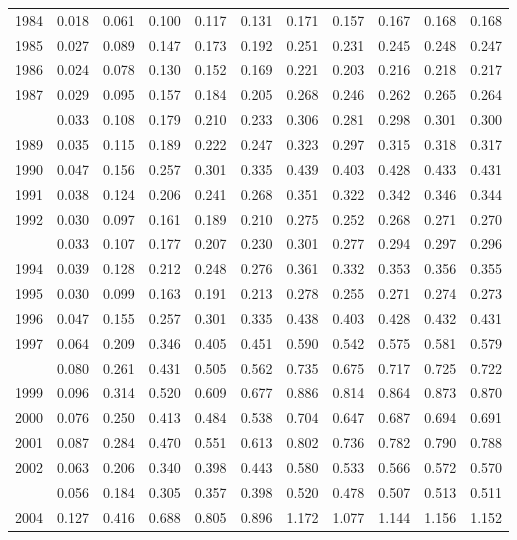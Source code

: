 \documentclass[
]{article}
\begin{document}
\begin{longtable}[t]{lrrrrrrrrrr}
1984 & 0.018 & 0.061 & 0.100 & 0.117 & 0.131 & 0.171 & 0.157 & 0.167 & 0.168 & 0.168\\
1985 & 0.027 & 0.089 & 0.147 & 0.173 & 0.192 & 0.251 & 0.231 & 0.245 & 0.248 & 0.247\\
1986 & 0.024 & 0.078 & 0.130 & 0.152 & 0.169 & 0.221 & 0.203 & 0.216 & 0.218 & 0.217\\
1987 & 0.029 & 0.095 & 0.157 & 0.184 & 0.205 & 0.268 & 0.246 & 0.262 & 0.265 & 0.264\\
\addlinespace
1988 & 0.033 & 0.108 & 0.179 & 0.210 & 0.233 & 0.306 & 0.281 & 0.298 & 0.301 & 0.300\\
1989 & 0.035 & 0.115 & 0.189 & 0.222 & 0.247 & 0.323 & 0.297 & 0.315 & 0.318 & 0.317\\
1990 & 0.047 & 0.156 & 0.257 & 0.301 & 0.335 & 0.439 & 0.403 & 0.428 & 0.433 & 0.431\\
1991 & 0.038 & 0.124 & 0.206 & 0.241 & 0.268 & 0.351 & 0.322 & 0.342 & 0.346 & 0.344\\
1992 & 0.030 & 0.097 & 0.161 & 0.189 & 0.210 & 0.275 & 0.252 & 0.268 & 0.271 & 0.270\\
\addlinespace
1993 & 0.033 & 0.107 & 0.177 & 0.207 & 0.230 & 0.301 & 0.277 & 0.294 & 0.297 & 0.296\\
1994 & 0.039 & 0.128 & 0.212 & 0.248 & 0.276 & 0.361 & 0.332 & 0.353 & 0.356 & 0.355\\
1995 & 0.030 & 0.099 & 0.163 & 0.191 & 0.213 & 0.278 & 0.255 & 0.271 & 0.274 & 0.273\\
1996 & 0.047 & 0.155 & 0.257 & 0.301 & 0.335 & 0.438 & 0.403 & 0.428 & 0.432 & 0.431\\
1997 & 0.064 & 0.209 & 0.346 & 0.405 & 0.451 & 0.590 & 0.542 & 0.575 & 0.581 & 0.579\\
\addlinespace
1998 & 0.080 & 0.261 & 0.431 & 0.505 & 0.562 & 0.735 & 0.675 & 0.717 & 0.725 & 0.722\\
1999 & 0.096 & 0.314 & 0.520 & 0.609 & 0.677 & 0.886 & 0.814 & 0.864 & 0.873 & 0.870\\
2000 & 0.076 & 0.250 & 0.413 & 0.484 & 0.538 & 0.704 & 0.647 & 0.687 & 0.694 & 0.691\\
2001 & 0.087 & 0.284 & 0.470 & 0.551 & 0.613 & 0.802 & 0.736 & 0.782 & 0.790 & 0.788\\
2002 & 0.063 & 0.206 & 0.340 & 0.398 & 0.443 & 0.580 & 0.533 & 0.566 & 0.572 & 0.570\\
\addlinespace
2003 & 0.056 & 0.184 & 0.305 & 0.357 & 0.398 & 0.520 & 0.478 & 0.507 & 0.513 & 0.511\\
2004 & 0.127 & 0.416 & 0.688 & 0.805 & 0.896 & 1.172 & 1.077 & 1.144 & 1.156 & 1.152\\

\end{longtable}
\end{document}
